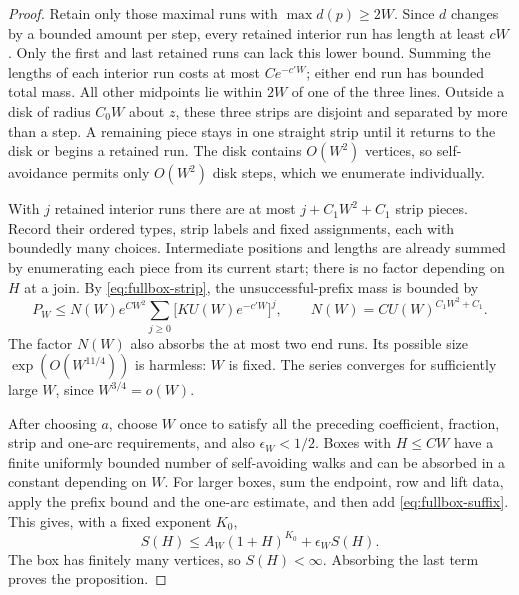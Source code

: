 \begin{proof}
Retain only those maximal runs with \(\max d(p)\ge2W\). Since \(d\)
changes by a bounded amount per step, every retained interior run has
length at least \(cW\). Only the first and last retained runs can lack
this lower bound. Summing the lengths of each interior run costs at most
\(C e^{-c'W}\); either end run has bounded total mass. All other
midpoints lie within \(2W\) of one of the three lines. Outside a disk
of radius \(C_0W\) about \(z\), these three strips are disjoint and
separated by more than a step. A remaining piece stays in one straight
strip until it returns to the disk or begins a retained run. The disk
contains \(O(W^2)\) vertices, so self-avoidance permits only \(O(W^2)\)
disk steps, which we enumerate individually.

With \(j\) retained interior runs there are at most
\(j+C_1W^2+C_1\) strip pieces. Record their ordered types, strip labels
and fixed assignments, each with boundedly many choices. Intermediate
positions and lengths are already summed by enumerating each piece from
its current start; there is no factor depending on \(H\) at a join.
By \eqref{eq:fullbox-strip}, the unsuccessful-prefix mass is bounded by
\begin{equation}\label{eq:fullbox-prefix}
 P_W\le N(W)e^{CW^2}
       \sum_{j\ge0}\bigl[K U(W)e^{-c'W}\bigr]^j,
 \qquad N(W)=C U(W)^{C_1W^2+C_1}.
\end{equation}
The factor \(N(W)\) also absorbs the at most two end runs. Its possible
size \(\exp(O(W^{11/4}))\) is harmless: \(W\) is fixed. The series
converges for sufficiently large \(W\), since \(W^{3/4}=o(W)\).

After choosing \(a\), choose \(W\) once to satisfy all the preceding
coefficient, fraction, strip and one-arc requirements, and also
\(\epsilon_W<1/2\). Boxes with \(H\le CW\) have a finite uniformly
bounded number of self-avoiding walks and can be absorbed in a constant
depending on \(W\). For larger boxes, sum the endpoint, row and lift
data, apply the prefix bound and the one-arc estimate, and then add
\eqref{eq:fullbox-suffix}. This gives, with a fixed exponent \(K_0\),
\[
 S(H)\le A_W(1+H)^{K_0}+\epsilon_W S(H).
\]
The box has finitely many vertices, so \(S(H)<\infty\). Absorbing the
last term proves the proposition.
\end{proof}
